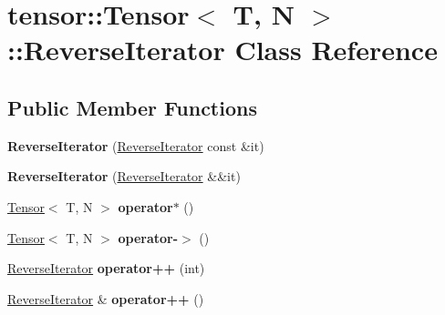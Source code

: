 \hypertarget{classtensor_1_1Tensor_1_1ReverseIterator}{}\section{tensor\+:\+:Tensor$<$ T, N $>$\+:\+:Reverse\+Iterator Class Reference}
\label{classtensor_1_1Tensor_1_1ReverseIterator}
\subsection*{Public Member Functions}
\begin{DoxyCompactItemize}
\item 
{\bfseries Reverse\+Iterator} (\hyperlink{classtensor_1_1Tensor_1_1ReverseIterator}{Reverse\+Iterator} const \&it)\hypertarget{classtensor_1_1Tensor_1_1ReverseIterator_a2495ae9f89a93f897dc75bfa7de25689}{}\label{classtensor_1_1Tensor_1_1ReverseIterator_a2495ae9f89a93f897dc75bfa7de25689}

\item 
{\bfseries Reverse\+Iterator} (\hyperlink{classtensor_1_1Tensor_1_1ReverseIterator}{Reverse\+Iterator} \&\&it)\hypertarget{classtensor_1_1Tensor_1_1ReverseIterator_a8958be9d0f0ad7b678742800c99b0ff2}{}\label{classtensor_1_1Tensor_1_1ReverseIterator_a8958be9d0f0ad7b678742800c99b0ff2}

\item 
\hyperlink{classtensor_1_1Tensor}{Tensor}$<$ T, N $>$ {\bfseries operator$\ast$} ()\hypertarget{classtensor_1_1Tensor_1_1ReverseIterator_a10f7ee9b594a09e80d7b0dde0c89ec97}{}\label{classtensor_1_1Tensor_1_1ReverseIterator_a10f7ee9b594a09e80d7b0dde0c89ec97}

\item 
\hyperlink{classtensor_1_1Tensor}{Tensor}$<$ T, N $>$ {\bfseries operator-\/$>$} ()\hypertarget{classtensor_1_1Tensor_1_1ReverseIterator_a6cce2ed6839801cc6a65013e75471018}{}\label{classtensor_1_1Tensor_1_1ReverseIterator_a6cce2ed6839801cc6a65013e75471018}

\item 
\hyperlink{classtensor_1_1Tensor_1_1ReverseIterator}{Reverse\+Iterator} {\bfseries operator++} (int)\hypertarget{classtensor_1_1Tensor_1_1ReverseIterator_a34f2a2fb8d23b629297e17635a8646c1}{}\label{classtensor_1_1Tensor_1_1ReverseIterator_a34f2a2fb8d23b629297e17635a8646c1}

\item 
\hyperlink{classtensor_1_1Tensor_1_1ReverseIterator}{Reverse\+Iterator} \& {\bfseries operator++} ()\hypertarget{classtensor_1_1Tensor_1_1ReverseIterator_ab854b3b7dba3ab27682f87bf041c291a}{}\label{classtensor_1_1Tensor_1_1ReverseIterator_ab854b3b7dba3ab27682f87bf041c291a}


\end{DoxyCompactItemize}
